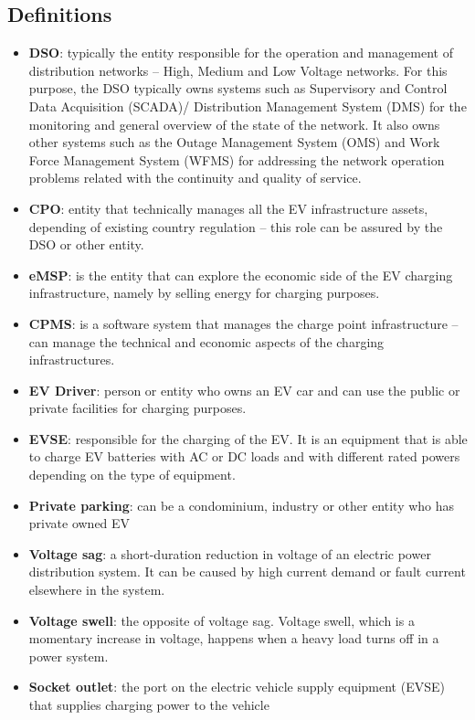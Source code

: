\subsection{Definitions}
\begin{itemize}
    \item \textbf{DSO}: typically the entity responsible for the operation and management of distribution networks – High, Medium and Low Voltage networks. For this purpose, the DSO typically owns systems such as Supervisory and Control Data Acquisition (SCADA)/ Distribution Management System (DMS) for the monitoring and general overview of the state of the network. It also owns other systems such as the Outage Management System (OMS) and Work Force Management System (WFMS) for addressing the network operation problems related with the continuity and quality of service.
    \item \textbf{CPO}: entity that technically manages all the EV infrastructure assets, depending of existing country regulation – this role can be assured by the DSO or other entity.
    \item \textbf{eMSP}: is the entity that can explore the economic side of the EV charging infrastructure, namely by selling energy for charging purposes.
    \item \textbf{CPMS}: is a software system that manages the charge point infrastructure – can manage the technical and economic aspects of the charging infrastructures.
    \item  \textbf{EV Driver}: person or entity who owns an EV car and can use the public or private facilities for charging purposes.
    \item \textbf{EVSE}: responsible for the charging of the EV. It is an equipment that is able to charge EV batteries with AC or DC loads and with different rated powers depending on the type of equipment.
    \item  \textbf{Private parking}: can be a condominium, industry or other entity who has private owned EV
    \item \textbf{Voltage sag}: a short-duration reduction in voltage of an electric power distribution system. It can be caused by high current demand or fault current elsewhere in the system.
    \item \textbf{Voltage swell}: the opposite of voltage sag. Voltage swell, which is a momentary increase in voltage, happens when a heavy load turns off in a power system.
    \item \textbf{Socket outlet}: the port on the electric vehicle supply equipment (EVSE) that supplies charging power to the vehicle

\end{itemize}
